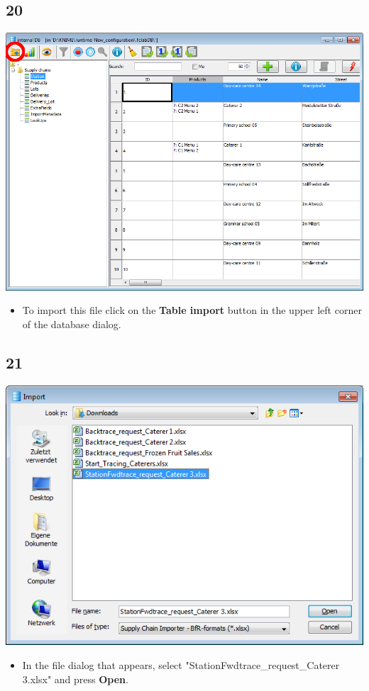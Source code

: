\documentclass{beamer}
\begin{document}
\subsection{20}
\begin{frame}
	\begin{center}
  		\includegraphics[height=0.6\textheight]{20.png}
	\end{center}
	\begin{itemize}
		\item To import this file click on the \textbf{Table import} button in the upper left corner of the database dialog.
	\end{itemize}
\end{frame}

\subsection{21}
\begin{frame}
	\begin{center}
  		\includegraphics[height=0.5\textheight]{21.png}
	\end{center}
	\begin{itemize}
		\item In the file dialog that appears, select "StationFwdtrace\_request\_Caterer 3.xlsx" and press \textbf{Open}.
	\end{itemize}
\end{frame}
\end{document}
